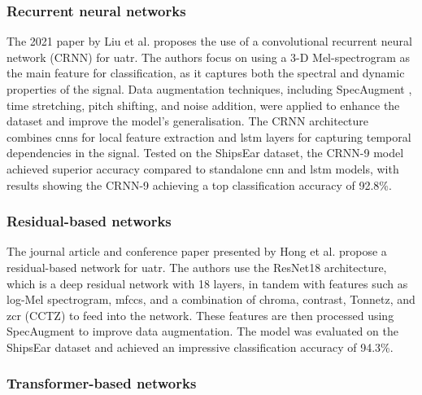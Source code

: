 \subsubsection{Recurrent neural networks}

The 2021 paper by Liu et al. \cite{liuUnderwaterTargetRecognition2021} proposes the use of a convolutional recurrent neural network (CRNN) for \acrshort{uatr}. The authors focus on using a 3-D Mel-spectrogram as the main feature for classification, as it captures both the spectral and dynamic properties of the signal. Data augmentation techniques, including SpecAugment \cite{park_specaugment_2019}, time stretching, pitch shifting, and noise addition, were applied to enhance the dataset and improve the model's generalisation. The CRNN architecture combines \acrshort{cnn}s for local feature extraction and \acrshort{lstm} layers for capturing temporal dependencies in the signal. Tested on the ShipsEar dataset, the CRNN-9 model achieved superior accuracy compared to standalone \acrshort{cnn} and \acrshort{lstm} models, with results showing the CRNN-9 achieving a top classification accuracy of 92.8\%. 

\subsubsection{Residual-based networks}

The journal article \cite{hong_underwater_2021} and conference paper \cite{hongUnderwaterAcousticTarget2021a} presented by Hong et al. propose a residual-based network for \acrshort{uatr}. The authors use the ResNet18 architecture, which is a deep residual network with 18 layers, in tandem with features such as log-Mel spectrogram, \acrshort{mfcc}s, and a combination of chroma, contrast, Tonnetz, and \acrlong{zcr} (CCTZ) to feed into the network. These features are then processed using SpecAugment \cite{park_specaugment_2019} to improve data augmentation. The model was evaluated on the ShipsEar dataset and achieved an impressive classification accuracy of 94.3\%.

\subsubsection{Transformer-based networks}

